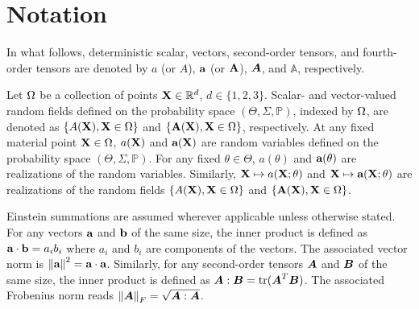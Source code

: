 \section{Notation}

In what follows, deterministic scalar, vectors, second-order tensors, and fourth-order tensors are denoted by $a$ (or $A$), $\textbf{a}$ (or $\textbf{A}$), $\boldsymbol{A}$, and $\mathbb{A}$, respectively.

Let $\Omega$ be a collection of points $\textbf{X} \in \mathbb{R}^d$, $d \in \{1, 2, 3\}$. Scalar- and vector-valued random fields defined on the probability space $(\Theta, \Sigma, \mathbb{P})$, indexed by $\Omega$, are denoted as $\{ A(\textbf{X}), \textbf{X} \in \Omega \}$ and $\{ \textbf{A}(\textbf{X}), \textbf{X} \in \Omega \}$, respectively.
At any fixed material point $\textbf{X} \in \Omega$, $a(\textbf{X})$ and $\textbf{a}(\textbf{X})$ are random variables defined on the probability space $(\Theta, \Sigma, \mathbb{P})$. For any fixed $\theta \in \Theta$, $a(\theta)$ and $\textbf{a}(\theta)$ are realizations of the random variables.
Similarly, $\textbf{X} \mapsto a(\textbf{X};\theta)$ and $\textbf{X} \mapsto \textbf{a}(\textbf{X};\theta)$ are realizations of the random fields $\{ A(\textbf{X}), \textbf{X} \in \Omega \}$ and $\{ \textbf{A}(\textbf{X}), \textbf{X} \in \Omega \}$.

Einstein summations are assumed wherever applicable unless otherwise stated. For any vectors $\textbf{a}$ and $\textbf{b}$ of the same size, the inner product is defined as $\textbf{a} \cdot \textbf{b} = a_ib_i$ where $a_i$ and $b_i$ are components of the vectors. The associated vector norm is $\left\lVert\textbf{a}\right\rVert^2 = \textbf{a} \cdot \textbf{a}$. Similarly, for any second-order tensors $\boldsymbol{A}$ and $\boldsymbol{B}$ of the same size, the inner product is defined as $\boldsymbol{A} : \boldsymbol{B} = \operatorname{tr}(\boldsymbol{A}^T \boldsymbol{B})$. The associated Frobenius norm reads $\left\lVert\boldsymbol{A}\right\rVert_F = \sqrt{\boldsymbol{A} : \boldsymbol{A}}$.
